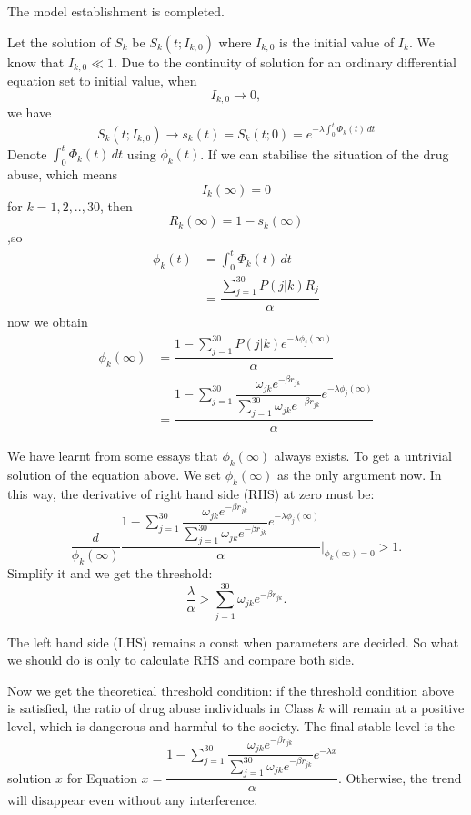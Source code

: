 \documentclass{mcmthesis}
\begin{document}
The model establishment is completed.

Let the solution of $S_k$ be $S_k(t;I_{k,0})$ where $I_{k,0}$ is the initial value of $I_k$. We know that $I_{k,0}\ll1$. Due to the continuity of solution for an ordinary differential equation set to initial value, when 
$$I_{k,0}\rightarrow 0,$$
we have
 $$S_k(t;I_{k,0})\rightarrow s_k(t)=S_k(t;0)=e^{-\lambda\int_{0}^{t} \Phi_k(t)\, dt}$$
 Denote $\int_{0}^{t} \Phi_k(t)\, dt$ using $\phi_k(t)$. If we can stabilise the situation of the drug abuse, which means$$I_k(\infty)=0$$ for $k=1,2,..,30$, then $$R_k(\infty)=1-s_k(\infty)$$,so
 \begin{equation}
 	\begin{aligned}
 		\phi_k(t)&=\int_{0}^{t} \Phi_k(t)\, dt\\
 		&=\dfrac{\sum_{j=1}^{30}P(j|k)R_j}{\alpha}
 	\end{aligned}
 \end{equation}
 now we obtain
 \begin{equation}
 	\begin{aligned}
 		\phi_k(\infty)&=\dfrac{1-\sum_{j=1}^{30}P(j|k)e^{-\lambda\phi_j(\infty)}}{\alpha}\\
 		&=\dfrac{1-\sum_{j=1}^{30}\dfrac{\omega_{jk}e^{-\beta r_{jk}}}{\sum_{j=1}^{30}\omega_{jk}e^{-\beta r_{jk}}}e^{-\lambda\phi_j(\infty)}}{\alpha}
 	\end{aligned}
 \end{equation}

 
 We have learnt from some essays that $\phi_k(\infty)$ always exists. To get a untrivial solution of the equation above. We set $\phi_k(\infty)$ as the only argument now. In this way, the derivative of right hand side (RHS) at zero must be:
$$\dfrac{d}{\phi_k(\infty)}\dfrac{1-\sum_{j=1}^{30}\dfrac{\omega_{jk}e^{-\beta r_{jk}}}{\sum_{j=1}^{30}\omega_{jk}e^{-\beta r_{jk}}}e^{-\lambda\phi_j(\infty)}}{\alpha}|_{\phi_k(\infty)=0}>1.$$
Simplify it and we get the threshold:$$\dfrac{\lambda}{\alpha}>\sum_{j=1}^{30}\omega_{jk}e^{-\beta r_{jk}}.$$

The left hand side (LHS) remains a const when parameters are decided. So what we should do is only to calculate RHS and compare both side.

Now we get the theoretical threshold condition:
if the threshold condition above is satisfied, the ratio of drug abuse individuals in Class $k$ will remain at a positive level, which is dangerous and harmful to the society. The final stable level is the solution $x$ for Equation $x=\dfrac{1-\sum_{j=1}^{30}\dfrac{\omega_{jk}e^{-\beta r_{jk}}}{\sum_{j=1}^{30}\omega_{jk}e^{-\beta r_{jk}}}e^{-\lambda x}}{\alpha}.$ Otherwise, the trend will disappear even without any interference.
\end{document}
